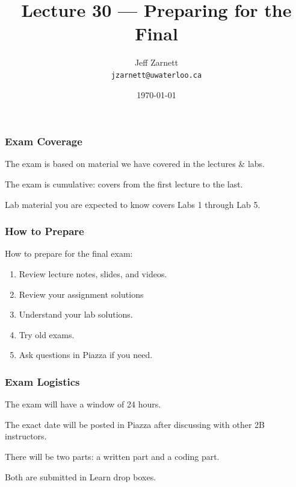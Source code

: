 

\title{Lecture 30 --- Preparing for the Final }

\author{Jeff Zarnett \\ \small \texttt{jzarnett@uwaterloo.ca}}
\date{\today}




\begin{frame}
  \titlepage

\end{frame}

\begin{frame}
\frametitle{Exam Coverage}

The exam is based on material we have covered in the lectures \& labs.

The exam is cumulative: covers from the first lecture to the last.

Lab material you are expected to know covers Labs 1 through Lab 5.

\end{frame}

\begin{frame}
\frametitle{How to Prepare}

How to prepare for the final exam:

\begin{enumerate}
	\item Review lecture notes, slides, and videos.
	\item Review your assignment solutions
	\item Understand your lab solutions.
	\item Try old exams.
	\item Ask questions in Piazza if you need.
\end{enumerate}

\end{frame}


\begin{frame}
\frametitle{Exam Logistics}

The exam will have a window of 24 hours.

The exact date will be posted in Piazza after discussing with other 2B instructors.

There will be two parts: a written part and a coding part.

Both are submitted in Learn drop boxes.

\end{frame}



